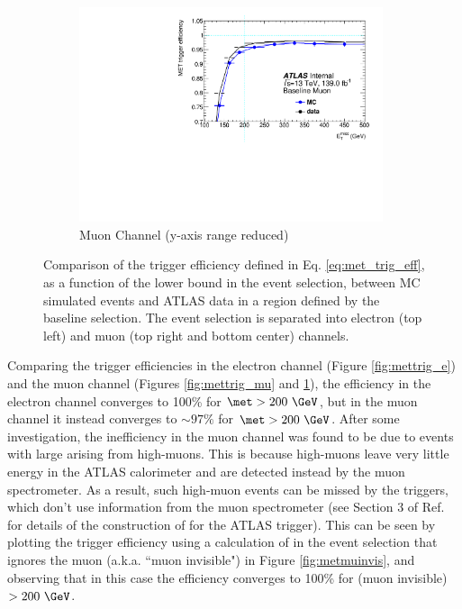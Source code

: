 \begin{figure}[htbp]
\begin{subfigure}{0.49\textwidth}
     \includegraphics[width = 0.98\textwidth]{Figures/5/efficiency_baseline_muon_zoom.pdf}
     \caption{Muon Channel (y-axis range reduced)}
     \label{fig:mettrig_mu_zoom}
     \end{subfigure}
     \caption{Comparison of the \met trigger efficiency defined in Eq. \ref{eq:met_trig_eff}, as a function of the \met lower bound in the event selection, between MC simulated events and ATLAS data in a region defined by the baseline selection. The event selection is separated into electron (top left) and muon (top right and bottom center) channels.}
     \label{fig:mettrig}
  \end{figure}
  
Comparing the trigger efficiencies in the electron channel (Figure \ref{fig:mettrig_e}) and the muon channel (Figures \ref{fig:mettrig_mu} and \ref{fig:mettrig_mu_zoom}), the efficiency in the electron channel converges to 100\% for \(\met > 200~\GeV\), but in the muon channel it instead converges to \(\sim97\%\) for \(\met > 200~\GeV\). After some investigation, the inefficiency in the muon channel was found to be due to events with large \met arising from high-\pt muons. This is because high-\pt muons leave very little energy in the ATLAS calorimeter and are detected instead by the muon spectrometer. As a result, such high-\pt muon events can be missed by the \met triggers, which don't use information from the muon spectrometer (see Section 3 of Ref. \cite{met_performance_2019} for details of the construction of \met for the ATLAS \met trigger). This can be seen by plotting the \met trigger efficiency using a calculation of \met in the event selection that ignores the muon \pt (a.k.a. ``muon invisible") in Figure \ref{fig:metmuinvis}, and observing that in this case the efficiency converges to 100\% for \met (muon invisible) \(> 200~\GeV\). 

